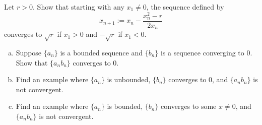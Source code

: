 \documentclass[12pt]{book}
\begin{document}
\begin{exercise}
Let $r > 0$.
Show that starting with any $x_1 \not= 0$, the sequence
defined by
\begin{equation*}
x_{n+1} := x_n - \frac{x_n^2-r}{2x_n}
\end{equation*}
converges to $\sqrt{r}$ if $x_1 > 0$ and $-\sqrt{r}$ if $x_1 < 0$.
\end{exercise}

\begin{exercise}
\begin{enumerate}[a)]
 \item Suppose $\{ a_n \}$ is a bounded sequence and $\{ b_n \}$ is a sequence
converging to 0. Show that $\{ a_n b_n \}$ converges to 0.
 \item Find an example where $\{ a_n \}$ is unbounded, $\{ b_n \}$ converges to
0, and $\{ a_n b_n \}$ is not convergent.
  \item Find an example where $\{ a_n \}$ is bounded, $\{ b_n \}$ converges to
some $x \not= 0$, and $\{ a_n b_n \}$ is not convergent.
\end{enumerate}
\end{exercise}



\end{document}
